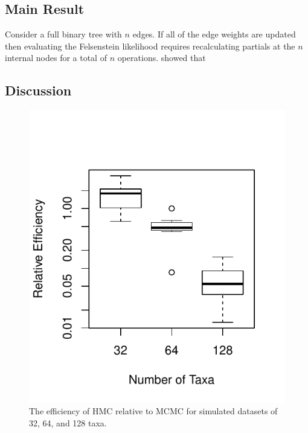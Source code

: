 \documentclass{article}
\begin{document}
    \subsection*{Main Result}

    Consider a full binary tree with $n$ edges.
    If all of the edge weights are updated then evaluating the Felsenstein
        likelihood requires recalculating partials at the $n$ internal nodes
        for a total of $n$ operations.
    \textcite{Nea11} showed that

    \subsection*{Discussion}

    \begin{figure}
        \centering
        \includegraphics[scale=0.8]{boxplot.pdf}
        \caption{The efficiency of \ac{HMC} relative to \ac{MCMC} for simulated
                 datasets of 32, 64, and 128 taxa.}
    \end{figure}

    \printbibliography
\end{document}
